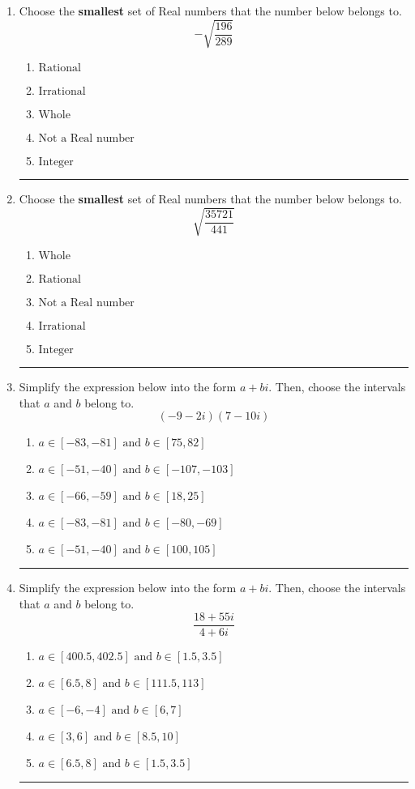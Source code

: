 \documentclass[14pt]{extbook}
\newcommand{\litem}[1]{\item#1\hspace*{-1cm}\rule{\textwidth}{0.4pt}}
\begin{document}
\begin{enumerate}
\litem{
Choose the \textbf{smallest} set of Real numbers that the number below belongs to.\[ -\sqrt{\frac{196}{289}} \]\begin{enumerate}[label=\Alph*.]
\item \( \text{Rational} \)
\item \( \text{Irrational} \)
\item \( \text{Whole} \)
\item \( \text{Not a Real number} \)
\item \( \text{Integer} \)

\end{enumerate} }
\litem{
Choose the \textbf{smallest} set of Real numbers that the number below belongs to.\[ \sqrt{\frac{35721}{441}} \]\begin{enumerate}[label=\Alph*.]
\item \( \text{Whole} \)
\item \( \text{Rational} \)
\item \( \text{Not a Real number} \)
\item \( \text{Irrational} \)
\item \( \text{Integer} \)

\end{enumerate} }
\litem{
Simplify the expression below into the form $a+bi$. Then, choose the intervals that $a$ and $b$ belong to.\[ (-9 - 2 i)(7 - 10 i) \]\begin{enumerate}[label=\Alph*.]
\item \( a \in [-83, -81] \text{ and } b \in [75, 82] \)
\item \( a \in [-51, -40] \text{ and } b \in [-107, -103] \)
\item \( a \in [-66, -59] \text{ and } b \in [18, 25] \)
\item \( a \in [-83, -81] \text{ and } b \in [-80, -69] \)
\item \( a \in [-51, -40] \text{ and } b \in [100, 105] \)

\end{enumerate} }
\litem{
Simplify the expression below into the form $a+bi$. Then, choose the intervals that $a$ and $b$ belong to.\[ \frac{18 + 55 i}{4 + 6 i} \]\begin{enumerate}[label=\Alph*.]
\item \( a \in [400.5, 402.5] \text{ and } b \in [1.5, 3.5] \)
\item \( a \in [6.5, 8] \text{ and } b \in [111.5, 113] \)
\item \( a \in [-6, -4] \text{ and } b \in [6, 7] \)
\item \( a \in [3, 6] \text{ and } b \in [8.5, 10] \)
\item \( a \in [6.5, 8] \text{ and } b \in [1.5, 3.5] \)


\end{enumerate}}
\end{enumerate}
\end{document}
